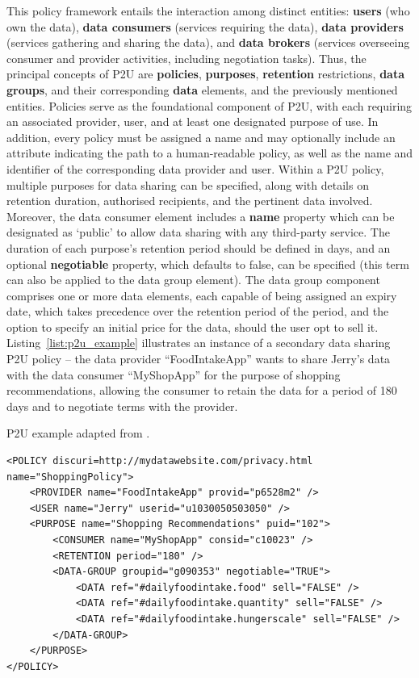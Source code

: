 This policy framework entails the interaction among distinct entities: \textbf{users} (who own the data), \textbf{data consumers} (services requiring the data), \textbf{data providers} (services gathering and sharing the data), and \textbf{data brokers} (services overseeing consumer and provider activities, including negotiation tasks).
Thus, the principal concepts of P2U are \textbf{policies}, \textbf{purposes}, \textbf{retention} restrictions, \textbf{data groups}, and their corresponding \textbf{data} elements, and the previously mentioned entities.
Policies serve as the foundational component of P2U, with each requiring an associated provider, user, and at least one designated purpose of use. 
In addition, every policy must be assigned a name and may optionally include an attribute indicating the path to a human-readable policy, as well as the name and identifier of the corresponding data provider and user. 
Within a P2U policy, multiple purposes for data sharing can be specified, along with details on retention duration, authorised recipients, and the pertinent data involved. 
Moreover, the data consumer element includes a \textbf{name} property which can be designated as `public' to allow data sharing with any third-party service. 
The duration of each purpose's retention period should be defined in days, and an optional \textbf{negotiable} property, which defaults to false, can be specified (this term can also be applied to the data group element).
The data group component comprises one or more data elements, each capable of being assigned an expiry date, which takes precedence over the retention period of the period, and the option to specify an initial price for the data, should the user opt to sell it.
Listing~\ref{list:p2u_example} illustrates an instance of a secondary data sharing P2U policy -- the data provider ``FoodIntakeApp'' wants to share Jerry's data with the data consumer ``MyShopApp'' for the purpose of shopping recommendations, allowing the consumer to retain the data for a period of 180 days and to negotiate terms with the provider.

\begin{listing}
\caption{P2U example adapted from \cite{iyilade_p2u_2014}.}
\label{list:p2u_example}
\begin{verbatim}
<POLICY discuri=http://mydatawebsite.com/privacy.html name="ShoppingPolicy">
    <PROVIDER name="FoodIntakeApp" provid="p6528m2" />
    <USER name="Jerry" userid="u1030050503050" />
    <PURPOSE name="Shopping Recommendations" puid="102">
        <CONSUMER name="MyShopApp" consid="c10023" />
        <RETENTION period="180" />
        <DATA-GROUP groupid="g090353" negotiable="TRUE">
            <DATA ref="#dailyfoodintake.food" sell="FALSE" />
            <DATA ref="#dailyfoodintake.quantity" sell="FALSE" />
            <DATA ref="#dailyfoodintake.hungerscale" sell="FALSE" />
        </DATA-GROUP>
    </PURPOSE>
</POLICY>
\end{verbatim}
\end{listing}

